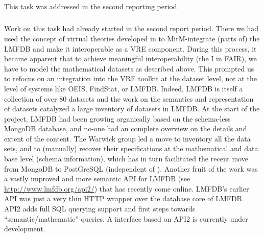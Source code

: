 \subparagraph{}
\label{dksbases@data-findstat}
This task was addressed in the second reporting period.
\medskip

\subparagraph{}
\label{dksbases@data-LMFDB}
Work on this task had already started in the second report period. There we had used the concept of virtual theories developed in  to MitM-integrate (parts of) the LMFDB and make it interoperable as a VRE component.
During this process, it became apparent that to achieve meaningful interoperability (the I in FAIR), we have to model the mathematical datasets as described above.
This prompted us to refocus on an integration into the \pn VRE toolkit at the dataset level, not at the level of systems like OEIS, FindStat, or LMFDB.
Indeed, LMFDB is itself a collection of over 80 datasets and the work on the semantics and representation of datasets catalyzed a large inventory of datasets in LMFDB.
At the start of the \pn project, LMFDB had been growing organically based on the schema-less MongoDB database, and no-one had an complete overview on the details and extent of the content.
The Warwick group led a move to inventory all the data sets, and to (manually) recover their specifications at the mathematical and data base level (schema information), which has in turn facilitated the recent move from MongoDB to PostGreSQL (independent of \pn).
Another fruit of the \pn work was a vastly improved and more semantic API for LMFDB (see \url{http://www.lmfdb.org/api2/}) that has recently come online.
LMFDB’s earlier API was just a very thin HTTP wrapper over the database core of LMFDB.
API2 adds full SQL querying support and first steps towards ``semantic/mathematic'' queries.
A \Sage interface based on API2 is currently under development.

